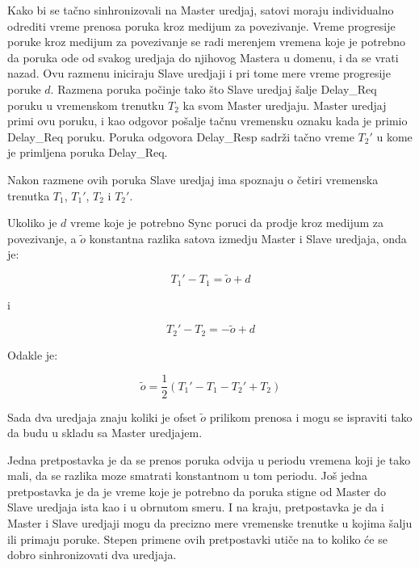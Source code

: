 \documentclass[a4paper,12pt, master]{etf}
\begin{document}
	Kako bi se ta\v{c}no sinhronizovali na Master uredjaj, satovi moraju
	individualno odrediti vreme prenosa poruka kroz medijum za povezivanje.
	Vreme progresije poruke kroz medijum za	povezivanje	se radi merenjem
	vremena koje je potrebno da poruka ode od svakog uredjaja do njihovog
	Mastera u domenu, i da se vrati nazad. Ovu razmenu iniciraju Slave uredjaji
	i pri tome mere vreme progresije poruke $d$. Razmena poruka po\v{c}inje
	tako \v{s}to Slave uredjaj \v{s}alje Delay\_Req poruku u vremenskom
	trenutku $T_2$ ka svom Master uredjaju. Master uredjaj primi ovu poruku, i
	kao	odgovor po\v{s}alje ta\v{c}nu vremensku oznaku kada je primio Delay\_Req
    poruku. Poruka odgovora Delay\_Resp sadr\v{z}i ta\v{c}no vreme $T_2'$ u kome
    je primljena poruka Delay\_Req.

	Nakon razmene ovih poruka Slave uredjaj ima spoznaju o \v{c}etiri vremenska
	trenutka $T_1$,	$T_1'$,	$T_2$ i $T_2'$.

	Ukoliko je $d$ vreme koje je potrebno Sync poruci da prodje kroz medijum za
	povezivanje, a $\tilde{o}$ konstantna razlika satova izmedju Master i Slave
	uredjaja, onda je:

	\begin{equation}
		T_1' - T_1 = \tilde{o} + d
	\end{equation}

	i

	\begin{equation}
			T_2' - T_2 = -\tilde{o} + d
	\end{equation}

	Odakle je:

	\begin{equation}
		\tilde{o} = \frac{1}{2} (T_1' - T_1 - T_2' + T_2)
	\end{equation}

	Sada dva uredjaja znaju koliki je ofset $\tilde{o}$ prilikom prenosa i mogu
	se ispraviti tako da budu u skladu sa Master uredjajem.

	Jedna pretpostavka je da se prenos poruka odvija u periodu vremena koji je
	tako mali, da se razlika moze smatrati konstantnom u tom periodu. Jo\v{s}
	jedna pretpostavka je da je vreme koje je potrebno da poruka stigne od
	Master do Slave uredjaja ista kao i u obrnutom smeru. I na kraju,
	pretpostavka je da i Master i Slave uredjaji mogu da precizno mere
	vremenske trenutke u kojima \v{s}alju ili primaju poruke. Stepen primene
	ovih pretpostavki uti\v{c}e na to koliko \'{c}e se dobro sinhronizovati dva
	uredjaja.

	\newpage
\end{document}
